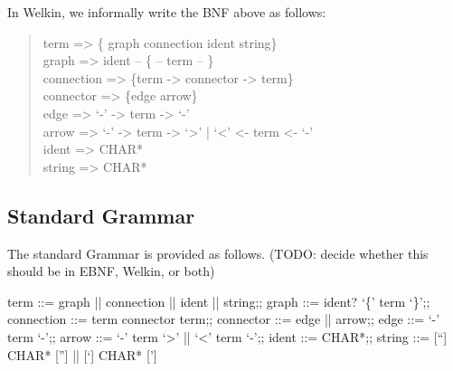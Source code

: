 In Welkin, we informally write the BNF above as follows:
\begin{quote}{\ttfamily \raggedright \noindent
	term => \{ graph connection ident string\}\\
	graph => {ident} -- \{ -- term -- \}\\
	connection => \{term -> connector -> term\}\\
	connector => \{edge arrow\}\\
	edge => `-' -> term -> `-' \\
	arrow =>  `-' -> term -> `>' | `<' <- term <- `-' \\
	ident => CHAR*\\
    string => CHAR*\\
}\end{quote}

\subsection{Standard Grammar}
The standard Grammar is provided as follows. (TODO: decide whether this should be in EBNF, Welkin, or both)
\renewcommand{\bnfexpr}{\textbf}
\begin{bnfgrammar}
	term ::= graph || connection || ident || string;;
	graph ::= ident? `\{' term `\}';;
	connection ::= term connector term;;
	connector ::= edge || arrow;;
	edge ::= `-' term `-';;
	arrow ::= `-' term `>' || `<' term `-';;
	ident ::= CHAR*;;
	string ::= [``] CHAR* [''] || [`] CHAR* [']
\end{bnfgrammar}

